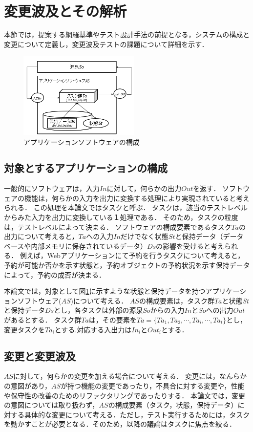 \documentclass[a4paper,12pt]{jreport}
\begin{document}
\section{変更波及とその解析}
本節では，提案する網羅基準やテスト設計手法の前提となる，システムの構成と変更について定義し，変更波及テストの課題について詳細を示す．

\begin{figure}[t]
  \begin{center}
  \includegraphics[width=6cm]{./image/fig-1.png}
  \caption{アプリケーションソフトウェアの構成}
  \label{fig:fig-1}
  \end{center}
\end{figure}

\subsection{対象とするアプリケーションの構成}
一般的にソフトウェアは，入力$In$に対して，何らかの出力$Out$を返す．
ソフトウェアの機能は，何らかの入力を出力に変換する処理により実現されていると考えられる．
この処理を本論文ではタスクと呼ぶ．
タスクは，該当のテストレベルからみた入力を出力に変換している１処理である．
そのため，タスクの粒度は，テストレベルによって決まる．%
ソフトウェアの構成要素であるタスク$Ta$の出力について考えると，$Ta$への入力$In$だけでなく状態$St$と保持データ（データベースや内部メモリに保存されているデータ）$Ds$の影響を受けると考えられる．
例えば，Webアプリケーションにて予約を行うタスクについて考えると，予約が可能か否かを示す状態と，予約オブジェクトの予約状況を示す保持データによって，予約の成否が決まる．

本論文では，対象として図\ref{fig:fig-1}に示すような状態と保持データを持つアプリケーションソフトウェア($AS$)について考える．
$AS$の構成要素は，タスク群$Ta$と状態$St$と保持データ$Ds$とし，各タスクは外部の源泉$So$からの入力$In$と$So$への出力$Out$があるとする．
タスク群$Ta$は，その要素を$Ta=\{Ta_1,Ta_2,\cdots,Ta_i,\cdots,Ta_t \}$とし，変更タスクを$Ta_i$とする.対応する入出力は$In_i$と$Out_i$とする．

\subsection{変更と変更波及}
$AS$に対して，何らかの変更を加える場合について考える．
変更には，なんらかの意図があり，$AS$が持つ機能の変更であったり，不具合に対する変更や，性能や保守性の改善のためのリファクタリングであったりする．
本論文では，変更の意図については取り扱わず，$AS$の構成要素（タスク，状態，保持データ）に対する具体的な変更について考える．ただし，テスト実行するためには，タスクを動かすことが必要となる．そのため，以降の議論はタスクに焦点を絞る．%
\end{document}
